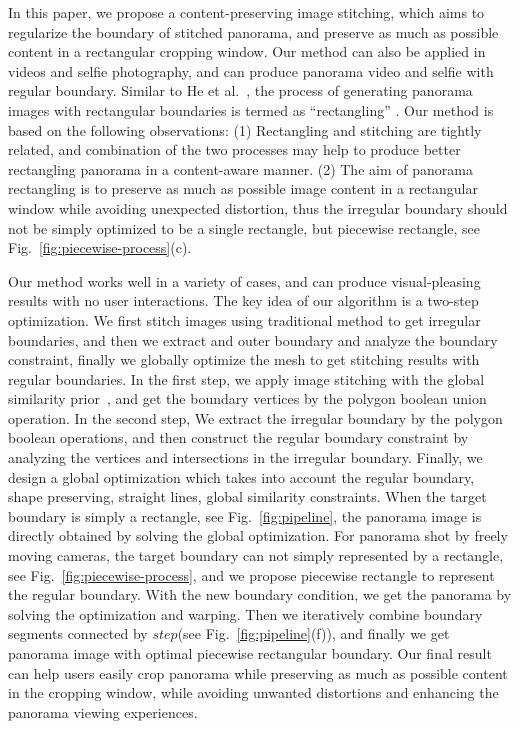 \documentclass[10pt,journal,compsoc]{IEEEtran}
\begin{document}
In this paper, we propose a content-preserving image stitching, which aims to regularize the boundary of stitched panorama, and preserve as much as possible content in a  rectangular cropping window.
Our method can also be applied in videos and selfie photography, and can produce panorama video and selfie with regular boundary.
Similar to He et al.~\cite{journals/tog/HeC013}, the process of generating panorama images with rectangular boundaries is termed as ``rectangling'' . Our method is based on the following observations:
(1) Rectangling and stitching are tightly related, and combination of the two processes may help to produce better rectangling panorama in a content-aware manner.
(2) The aim of panorama rectangling is to preserve as much as possible image content in a rectangular window while avoiding unexpected distortion, thus the irregular boundary should not be simply optimized to be a single rectangle, but piecewise rectangle, see Fig.~\ref{fig:piecewise-process}(c).

Our method works well in a variety of cases, and can produce visual-pleasing results with no user interactions. The key idea of our algorithm is a two-step optimization. We first stitch images using traditional method to get irregular boundaries, and then we extract and outer boundary and analyze the boundary constraint, finally we globally optimize the mesh to get stitching results with regular boundaries.
In the first step, we apply image stitching with the global similarity prior~\cite{conf/eccv/ChenC16}, and get the boundary vertices by the polygon boolean union operation.
In the second step, We extract the irregular boundary by the polygon boolean operations, and then construct the regular boundary constraint by analyzing the vertices and intersections in the irregular boundary.
Finally, we design a global optimization which takes into account the regular boundary, shape preserving, straight lines, global similarity constraints.
When the target boundary is simply a rectangle, see Fig.~\ref{fig:pipeline}, the panorama image is directly obtained by solving the global optimization.
For panorama shot by freely moving cameras, the target boundary can not simply represented by a rectangle, see Fig.~\ref{fig:piecewise-process}, and we propose piecewise rectangle to represent the regular boundary.
With the new boundary condition, we get the panorama by solving the optimization and warping. Then we iteratively combine boundary segments connected by $step$(see Fig.~\ref{fig:pipeline}(f)), and finally we get panorama image with optimal piecewise rectangular boundary. Our final result can help users easily crop panorama while preserving as much as possible content in the cropping window, while avoiding unwanted distortions and enhancing the panorama viewing experiences.
\end{document}

